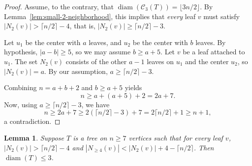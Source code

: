 \documentclass[12pt,reqno]{amsart}
\newtheorem{lem}[thm]{Lemma}
\theoremstyle{definition}
\newcommand{\C}{\mathcal{C}}
\newcommand{\diam}{\operatorname{diam}}
\begin{document}
\begin{proof}
Assume, to the contrary, that $\diam(\C_3(T)) = \lfloor 3n/2\rfloor$. By Lemma~\ref{lem:small-2-neighborhood}, this implies that \emph{every} leaf $v$ must satisfy $|N_2(v)| > \lceil n/2 \rceil - 4$, that is, $|N_2(v)| \geq \lceil n/2 \rceil - 3$.

Let $u_1$ be the center with $a$ leaves, and $u_2$ be the center with $b$ leaves. By hypothesis, $|a-b| \ge 5$, so we may assume $b \ge a+5$.
Let $v$ be a leaf attached to $u_1$. The set $N_2(v)$ consists of the other $a-1$ leaves on $u_1$ and the center $u_2$, so $|N_2(v)| = a$.
By our assumption, $a \geq \lceil n/2 \rceil - 3$. 

Combining $n = a+b+2$ and $b \ge a+5$ yields
\[
n \ge a + (a+5) + 2 = 2a+7.
\]
Now, using $a \ge \lceil n/2 \rceil - 3$, we have
\[
n \ge 2a+7 \ge 2(\lceil n/2 \rceil - 3) + 7 = 2\lceil n/2 \rceil + 1 \geq n+1,
\]
a contradiction.
\end{proof}

\begin{lem}\label{lem:reduction-diameter-3}
   Suppose $T$ is a tree on $n \ge 7$ vertices such that for every leaf $v$, $|N_2(v)| > \lceil n/2 \rceil - 4$ and $|N_{\ge 4}(v)| < |N_2(v)| + 4 - \lceil n/2 \rceil$. Then $\diam(T) \le 3$.
\end{lem}
\end{document}
